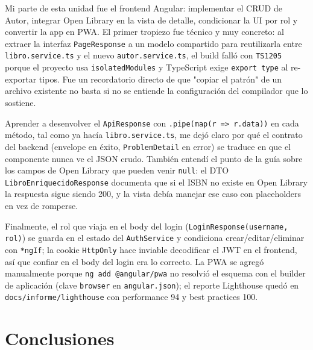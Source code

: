\documentclass[12pt,a4paper]{article}
\begin{document}
Mi parte de esta unidad fue el frontend Angular: implementar el CRUD de Autor, integrar
Open Library en la vista de detalle, condicionar la UI por rol y convertir la app en
PWA. El primer tropiezo fue técnico y muy concreto: al extraer la interfaz
\texttt{PageResponse} a un modelo compartido para reutilizarla entre
\texttt{libro.service.ts} y el nuevo \texttt{autor.service.ts}, el build falló con
\texttt{TS1205} porque el proyecto usa \texttt{isolatedModules} y TypeScript exige
\texttt{export type} al re-exportar tipos. Fue un recordatorio directo de que "copiar el
patrón" de un archivo existente no basta si no se entiende la configuración del
compilador que lo sostiene.

Aprender a desenvolver el \texttt{ApiResponse} con \texttt{.pipe(map(r => r.data))} en
cada método, tal como ya hacía \texttt{libro.service.ts}, me dejó claro por qué el
contrato del backend (envelope en éxito, \texttt{ProblemDetail} en error) se traduce en
que el componente nunca ve el JSON crudo. También entendí el punto de la guía sobre los
campos de Open Library que pueden venir \texttt{null}: el DTO
\texttt{LibroEnriquecidoResponse} documenta que si el ISBN no existe en Open Library la
respuesta sigue siendo 200, y la vista debía manejar ese caso con placeholders en vez de
romperse.

Finalmente, el rol que viaja en el body del login (\texttt{LoginResponse(username,
rol)}) se guarda en el estado del \texttt{AuthService} y condiciona crear/editar/eliminar
con \texttt{*ngIf}; la cookie \texttt{HttpOnly} hace inviable decodificar el JWT en el
frontend, así que confiar en el body del login era lo correcto. La PWA se agregó
manualmente porque \texttt{ng add @angular/pwa} no resolvió el esquema con el builder de
aplicación (clave \texttt{browser} en \texttt{angular.json}); el reporte Lighthouse
quedó en \texttt{docs/informe/lighthouse} con performance 94 y best practices 100.

\newpage

\section{Conclusiones}
\end{document}
